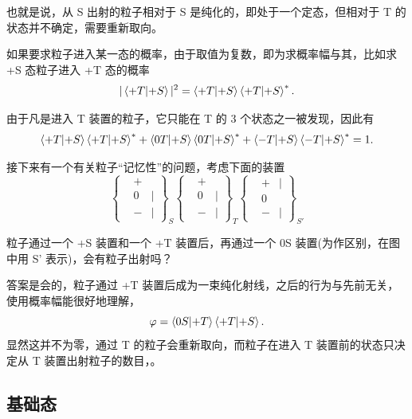 \documentclass[12pt,a4paper,oneside]{book}
\begin{document}
也就是说，从 S 出射的粒子相对于 S 是纯化的，即处于一个定态，但相对于 T 的状态并不确定，需要重新取向。

如果要求粒子进入某一态的概率，由于取值为复数，即为求概率幅与其，比如求 +S 态粒子进入 +T 态的概率 
\begin{equation}
    |\braket{+T}{+S}|^2=\braket{+T}{+S}\braket{+T}{+S}^*. 
\end{equation}

由于凡是进入 T 装置的粒子，它只能在 T 的 3 个状态之一被发现，因此有
\begin{equation}
\braket{+T}{+S}\braket{+T}{+S}^* + \braket{0T}{+S}\braket{0T}{+S}^*+\braket{-T}{+S}\braket{-T}{+S}^* = 1.\label{normalize}
\end{equation}

接下来有一个有关粒子“记忆性”的问题，考虑下面的装置
\begin{equation*}
    \left\{\begin{aligned}
        &+ \\
        &0&\boldsymbol{|}\\
        &-&\boldsymbol{|}
        \end{aligned}\right\}_S
        \left\{\begin{aligned}
        &+ \\
        &0&\boldsymbol{|}\\
        &-&\boldsymbol{|}
        \end{aligned}\right\}_T
        \left\{\begin{aligned}
        &+&\boldsymbol{|} \\
        &0\\
        &-&\boldsymbol{|}
        \end{aligned}\right\}_{S'}
\end{equation*}

粒子通过一个 +S 装置和一个 +T 装置后，再通过一个 0S 装置(为作区别，在图中用 S' 表示)，会有粒子出射吗？

答案是会的，粒子通过 +T 装置后成为一束纯化射线，之后的行为与先前无关，使用概率幅能很好地理解，
\begin{equation}
    \varphi=\braket{0S}{+T}\braket{+T}{+S}.
\end{equation}
显然这并不为零，通过 T 的粒子会重新取向，而粒子在进入 T 装置前的状态只决定从 T 装置出射粒子的数目，。

\subsection{基础态}
\end{document}
